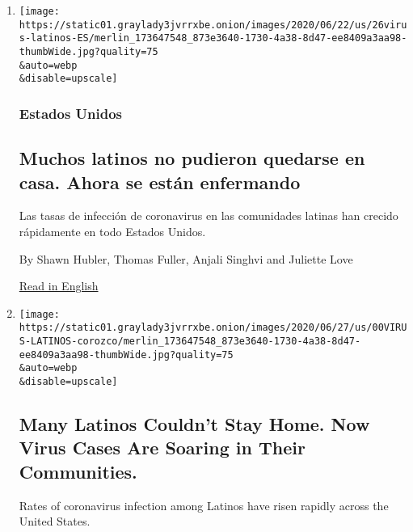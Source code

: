 \begin{enumerate}
\def\labelenumi{\arabic{enumi}.}
\item
  \href{/es/2020/06/26/espanol/latinos-coronavirus.html}{}

  \texttt{[image: https://static01.graylady3jvrrxbe.onion/images/2020/06/22/us/26virus-latinos-ES/merlin\_173647548\_873e3640-1730-4a38-8d47-ee8409a3aa98-thumbWide.jpg?quality=75\\\&auto=webp\\\&disable=upscale]}

  \hypertarget{estados-unidos}{%
  \subsubsection{Estados Unidos}\label{estados-unidos}}

  \hypertarget{muchos-latinos-no-pudieron-quedarse-en-casa-ahora-se-estuxe1n-enfermando}{%
  \subsection{Muchos latinos no pudieron quedarse en casa. Ahora se
  están
  enfermando}\label{muchos-latinos-no-pudieron-quedarse-en-casa-ahora-se-estuxe1n-enfermando}}

  Las tasas de infección de coronavirus en las comunidades latinas han
  crecido rápidamente en todo Estados Unidos.

  By Shawn Hubler, Thomas Fuller, Anjali Singhvi and Juliette Love

  \href{https://www.nytimes3xbfgragh.onion/2020/06/26/us/corona-virus-latinos.html}{Read
  in English}
\item
  \href{/2020/06/26/us/corona-virus-latinos.html}{}

  \texttt{[image: https://static01.graylady3jvrrxbe.onion/images/2020/06/27/us/00VIRUS-LATINOS-corozco/merlin\_173647548\_873e3640-1730-4a38-8d47-ee8409a3aa98-thumbWide.jpg?quality=75\\\&auto=webp\\\&disable=upscale]}

  \hypertarget{many-latinos-couldnt-stay-home-now-virus-cases-are-soaring-in-their-communities}{%
  \subsection{Many Latinos Couldn't Stay Home. Now Virus Cases Are
  Soaring in Their
  Communities.}\label{many-latinos-couldnt-stay-home-now-virus-cases-are-soaring-in-their-communities}}

  Rates of coronavirus infection among Latinos have risen rapidly across
  the United States.


\end{enumerate}
